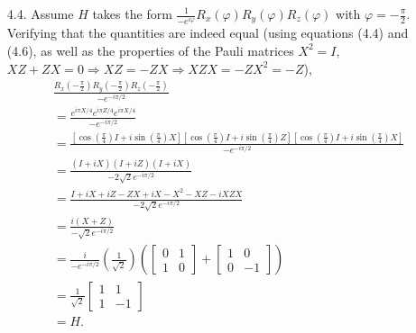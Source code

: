\documentclass[a4paper,12pt]{article}
\begin{document}
\begin{enumerate}
    \item[4.4.] Assume $H$ takes the form $\frac{1}{-e^{i\varphi}} R_x(\varphi) R_y(\varphi) R_z(\varphi)$ with $\varphi = -\frac{\pi}{2}$. Verifying that the quantities are indeed equal (using equations (4.4) and (4.6), as well as the properties of the Pauli matrices $X^2 = I$, $XZ + ZX = 0 \Rightarrow XZ = -ZX \Rightarrow XZX = -ZX^2 = -Z$),
        \begin{align*}
            &\frac{R_x(-\frac{\pi}{2}) R_y(-\frac{\pi}{2}) R_z(-\frac{\pi}{2})}{-e^{-i\pi/2}} \\
            &= \frac{e^{i\pi X/4} e^{i\pi Z / 4} e^{i\pi X /4}}{-e^{-i\pi/2}} \\
            &= \frac{\left[ \cos{\left( \frac{\pi}{4} \right)} I + i\sin{\left( \frac{\pi}{4} \right)} X \right] \left[ \cos{\left( \frac{\pi}{4} \right)} I + i\sin{\left( \frac{\pi}{4} \right)} Z \right] \left[ \cos{\left( \frac{\pi}{4} \right)} I + i\sin{\left( \frac{\pi}{4} \right)} X \right]}{-e^{-i\pi/2}} \\
            &= \frac{(I + iX)(I + iZ)(I + iX)}{-2\sqrt{2}e^{-i\pi/2}} \\
            &= \frac{I + iX + iZ - ZX + iX - X^2 - XZ - iXZX}{-2\sqrt{2}e^{-i\pi/2}} \\
            &= \frac{i(X + Z)}{-\sqrt{2}e^{-i\pi/2}} \\
            &= \frac{i}{-e^{-i\pi/2}} \left( \frac{1}{\sqrt{2}} \right) \left(
            \left[ \begin{array}{cc}
                0 & 1 \\
                1 & 0
            \end{array} \right]
            + \left[ \begin{array}{cc}
                1 & 0 \\
                0 & -1
            \end{array} \right] \right) \\
            &= \frac{1}{\sqrt{2}}
            \left[ \begin{array}{cc}
                1 & 1 \\
                1 & -1
            \end{array} \right] \\
            &= H.
        \end{align*}


\end{enumerate}
\end{document}
